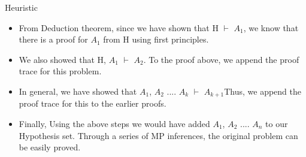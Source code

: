 \documentclass{beamer}
\begin{document}
\begin{frame}{Heuristic}




\begin{itemize}
  \item From Deduction theorem, since we have shown that H $\vdash$ $A_{1}$, we know that there is a proof for $A_{1}$ from H using first principles. 
  \item We also showed that  H, $A_{1}$ $\vdash$ $A_{2}$. To the proof above, we append the proof trace for this problem.
  \item In general, we have showed that $A_{1}$, $A_{2}$ .... $A_{k}$ $\vdash$ $A_{k+1}$Thus, we append the proof  trace for this to the earlier proofs. 
  \item Finally, Using the above steps we would have added \newline $A_{1}$, $A_{2}$ .... $A_{n}$ to our Hypothesis set. Through a series of MP inferences, the original problem can be easily proved.
\end{itemize} 


\vskip 1cm



\end{frame}
\end{document}
